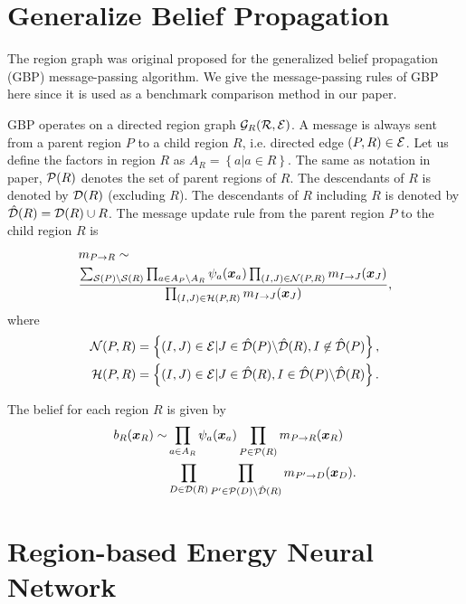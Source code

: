 \section{Generalize Belief Propagation}
\label{apdix:sec:gbp}
The region graph was original proposed for the generalized belief propagation (GBP) message-passing algorithm\cite{Yedidia:2000:GBP:3008751.3008848,yedida2005constucting,DBLP:journals/corr/abs-1207-4158}. We give the message-passing rules of GBP here since it is used as a benchmark comparison method in our paper.

GBP operates on a directed region graph $\mathcal{G}_R(\mathcal{R},\mathcal{E})$. A message is always sent from a parent region $P$ to a child region $R$, i.e. directed edge $(P, R)\in \mathcal{E}$. Let us define the factors in region $R$ as $A_R = \left\{ a | a \in R \right\}$.
The same as notation in paper, $\mathcal{P}(R)$ denotes the set of parent regions of $R$. The descendants of $R$ is denoted by $\mathcal{D}(R)$ (excluding $R$). The descendants of $R$ including $R$ is denoted by $\hat{\mathcal{D}}(R) = \mathcal{D}(R) \cup R$. The message update rule from the parent region $P$ to the child region $R$ is
\begin{align}
  &m_{P\rightarrow R} \sim \nonumber \\
  &\frac{\sum_{\mathcal{S}(P)\backslash
    \mathcal{S}(R)}\prod_{a\in A_P\backslash A_R}\psi_a(\bm{x}_a)\prod_{(I,J)
    \in \mathcal{N}(P, R)}m_{I\rightarrow J}(\bm{x}_J)}{\prod_{(I,J)
    \in \mathcal{H}(P, R)}m_{I\rightarrow J}(\bm{x}_J)},
\end{align}
where
\begin{align}
  \mathcal{N}(P, R) &= \left\{ (I,J)\in \mathcal{E} | J \in \hat{\mathcal{D}}(P) \backslash \hat{\mathcal{D}}(R), I \not\in \hat{\mathcal{D}}(P)\right\},\nonumber \\
  \mathcal{H}(P, R) &= \left\{ (I,J) \in \mathcal{E} | J \in \hat{\mathcal{D}}(R), I \in \hat{\mathcal{D}}(P) \backslash \hat{\mathcal{D}}(R) \right\}.
\end{align}

The belief for each region $R$ is given by
\begin{align}
  b_R(\bm{x}_R) \sim &\prod_{a\in A_R} \psi_a(\bm{x}_a) \prod_{P\in
                       \mathcal{P}(R)} m_{P\rightarrow R}(\bm{x}_R) \nonumber \\
                     & \prod_{D\in \mathcal{D}(R)} \prod_{P^{\prime} \in \mathcal{P}(D) \backslash \hat{\mathcal{D}}(R)} m_{P^{\prime}\rightarrow D}(\bm{x}_D).
\end{align}





\section{Region-based Energy Neural Network}


